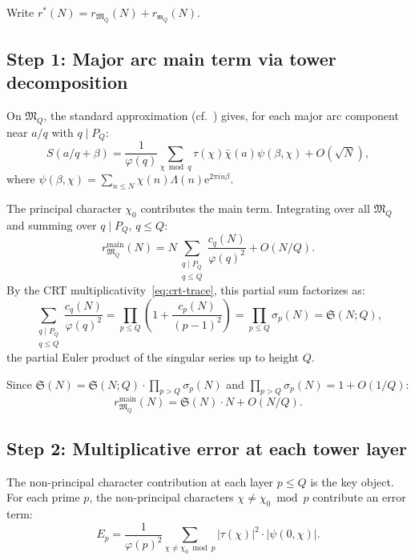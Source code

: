 \documentclass[11pt,a4paper]{article}
\theoremstyle{remark}
\newcommand{\mM}{\mathfrak{M}}
\newcommand{\mm}{\mathfrak{m}}
\newcommand{\e}{\mathrm{e}}
\begin{document}
Write $r^*(N) = r_{\mM_Q}(N) + r_{\mm_Q}(N)$.

\subsection{Step 1: Major arc main term via tower decomposition}
\label{subsec:major-main}

On $\mM_Q$, the standard approximation
(cf.~\cite[Ch.~12--13]{Davenport2000}) gives, for each major arc
component near $a/q$ with $q \mid P_Q$:
\begin{equation}
\label{eq:S-approx}
  S(a/q+\beta) = \frac{1}{\varphi(q)}\sum_{\chi\bmod q}\tau(\chi)\bar{\chi}(a)
    \psi(\beta,\chi) + O(\sqrt{N}),
\end{equation}
where $\psi(\beta,\chi) = \sum_{n \leq N}\chi(n)\Lambda(n)\e^{2\pi i n\beta}$.

The principal character $\chi_0$ contributes the main term.  Integrating
over all $\mM_Q$ and summing over $q \mid P_Q$, $q \leq Q$:
\begin{equation}
\label{eq:main-term-tower}
  r_{\mM_Q}^{\text{main}}(N) = N \sum_{\substack{q \mid P_Q \\ q \leq Q}}
    \frac{c_q(N)}{\varphi(q)^2} + O(N/Q).
\end{equation}
By the CRT multiplicativity~\eqref{eq:crt-trace}, this partial sum
factorizes as:
\begin{equation}
\label{eq:partial-product}
  \sum_{\substack{q \mid P_Q \\ q \leq Q}} \frac{c_q(N)}{\varphi(q)^2}
    = \prod_{p \leq Q} \left(1 + \frac{c_p(N)}{(p-1)^2}\right)
    = \prod_{p \leq Q} \sigma_p(N) = \mathfrak{S}(N; Q),
\end{equation}
the partial Euler product of the singular series up to height $Q$.

Since $\mathfrak{S}(N) = \mathfrak{S}(N;Q) \cdot \prod_{p > Q}\sigma_p(N)$
and $\prod_{p > Q}\sigma_p(N) = 1 + O(1/Q)$:
\begin{equation}
\label{eq:main-term-SS}
  r_{\mM_Q}^{\text{main}}(N) = \mathfrak{S}(N) \cdot N + O(N/Q).
\end{equation}

\subsection{Step 2: Multiplicative error at each tower layer}
\label{subsec:layer-error}

The non-principal character contribution at each layer $p \leq Q$ is
the key object.  For each prime $p$, the non-principal characters
$\chi \neq \chi_0 \bmod p$ contribute an error term:
\begin{equation}
\label{eq:layer-error}
  E_p = \frac{1}{\varphi(p)^2}\sum_{\chi \neq \chi_0 \bmod p}
    |\tau(\chi)|^2 \cdot |\psi(0,\chi)|.
\end{equation}
\end{document}
